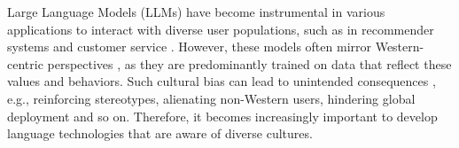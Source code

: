 \documentclass{article} %
\begin{document}
Large Language Models (LLMs) have become instrumental in various applications  to interact with diverse user populations, such as in recommender systems \citep{li2023prompt, fan2023recommender} and customer service \citep{pandya2023automating}. %
However, these models often mirror Western-centric perspectives \citep{santurkar2023whose, durmus2023towards}, as they are predominantly trained on data that reflect these values and behaviors. Such cultural bias can lead to unintended consequences \citep{ryan2024unintended}, e.g., reinforcing stereotypes, alienating non-Western users, hindering global deployment and so on. Therefore, it becomes increasingly important to develop language technologies that are aware of diverse cultures. 
\end{document}

